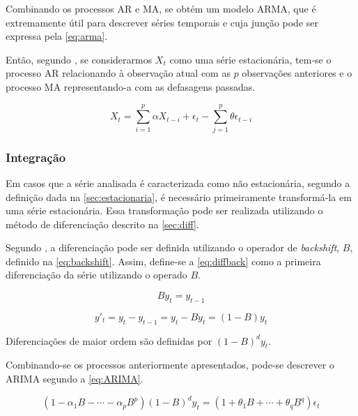 \documentclass[
    12pt,
    oneside,
    a4paper,
    english,
    brazil
]{abntex2}
\begin{document}
Combinando os processos  AR e MA, se  obtém um modelo ARMA,  que é extremamente
útil  para descrever  séries temporais  e cuja  junção pode  ser expressa  pela
\autoref{eq:arma}.

Então, segundo , se  considerarmos $X_t$ como uma
série estacionária, tem-se o processo AR relacionando à observação atual com as
$p$ observações  anteriores e o  processo MA representando-a com  as defasagens
passadas.

\begin{equation}
    \label{eq:arma}
    X_t = \sum_{i = 1}^{p}{\alpha X_{t-i}} + \epsilon_t - \sum_{j = 1}^{p}{\theta \epsilon_{t-i}}
\end{equation}

\subsubsection{Integração}

Em casos que  a série analisada é caracterizada como  não estacionária, segundo
a  definição dada  na  \autoref{sec:estacionaria},  é necessário  primeiramente
transformá-la em uma série estacionária.  Essa transformação pode ser realizada
utilizando o método de diferenciação descrito na \autoref{sec:diff}.

Segundo  ,  a  diferenciação  pode ser  definida  utilizando  o
operador de \textit{backshift}, $B$, definido na \autoref{eq:backshift}. Assim,
define-se  a  \autoref{eq:diffback}  como  a primeira  diferenciação  da  série
utilizando o operado $B$.

\begin{equation}
    \label{eq:backshift}
    By_t = y_{t-1}
\end{equation}

\begin{equation}
    \label{eq:diffback}
    y'_t = y_t - y_{t-1} = y_t - By_t = (1-B)y_t
\end{equation}

Diferenciações de maior ordem são definidas por $(1-B)^dy_t$.

Combinando-se  os processos  anteriormente  apresentados,  pode-se descrever  o
ARIMA segundo a \autoref{eq:ARIMA}.

\begin{equation}
    \label{eq:ARIMA}
    (1 - \alpha_1B-\cdots-\alpha_pB^p)(1-B)^dy_t=(1+\theta_1B+\cdots+\theta_qB^q)\epsilon_t
\end{equation}
\end{document}
